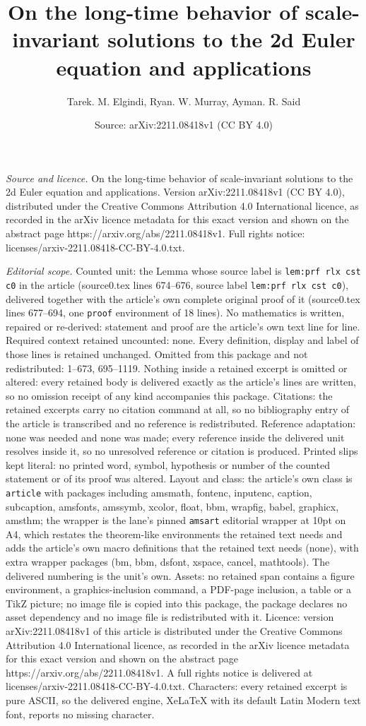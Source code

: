 \documentclass[10pt,a4paper]{amsart}
\title[On the long-time behavior of scale-invariant solutions to th]{On the long-time behavior of scale-invariant solutions to the 2d Euler equation and applications}
\author{Tarek. M. Elgindi, Ryan. W. Murray, Ayman. R. Said}
\date{Source: arXiv:2211.08418v1 (CC BY 4.0)}
\begin{document}
\maketitle

\noindent\emph{Source and licence.} On the long-time behavior of scale-invariant solutions to the 2d Euler equation and applications. Version arXiv:2211.08418v1 (CC BY 4.0), distributed under the Creative Commons Attribution 4.0 International licence, as recorded in the arXiv licence metadata for this exact version and shown on the abstract page https://arxiv.org/abs/2211.08418v1. Full rights notice: licenses/arxiv-2211.08418-CC-BY-4.0.txt.\par\smallskip

\noindent\textit{Editorial scope.} Counted unit: the Lemma whose source label is \texttt{lem:prf rlx cst c0} in the article (source0.tex lines 674--676, source label \texttt{lem:prf rlx cst c0}), delivered together with the article's own complete original proof of it (source0.tex lines 677--694, one \texttt{proof} environment of 18 lines). No mathematics is written, repaired or re-derived: statement and proof are the article's own text line for line. Required context retained uncounted: none. Every definition, display and label of those lines is retained unchanged. Omitted from this package and not redistributed: 1--673, 695--1119. Nothing inside a retained excerpt is omitted or altered: every retained body is delivered exactly as the article's lines are written, so no omission receipt of any kind accompanies this package. Citations: the retained excerpts carry no citation command at all, so no bibliography entry of the article is transcribed and no reference is redistributed. Reference adaptation: none was needed and none was made; every reference inside the delivered unit resolves inside it, so no unresolved reference or citation is produced. Printed slips kept literal: no printed word, symbol, hypothesis or number of the counted statement or of its proof was altered. Layout and class: the article's own class is \texttt{article} with packages including amsmath, fontenc, inputenc, caption, subcaption, amsfonts, amssymb, xcolor, float, bbm, wrapfig, babel, graphicx, amsthm; the wrapper is the lane's pinned \texttt{amsart} editorial wrapper at 10pt on A4, which restates the theorem-like environments the retained text needs and adds the article's own macro definitions that the retained text needs (none), with extra wrapper packages (bm, bbm, dsfont, xspace, cancel, mathtools). The delivered numbering is the unit's own. Assets: no retained span contains a figure environment, a graphics-inclusion command, a PDF-page inclusion, a table or a TikZ picture; no image file is copied into this package, the package declares no asset dependency and no image file is redistributed with it. Licence: version arXiv:2211.08418v1 of this article is distributed under the Creative Commons Attribution 4.0 International licence, as recorded in the arXiv licence metadata for this exact version and shown on the abstract page https://arxiv.org/abs/2211.08418v1. A full rights notice is delivered at licenses/arxiv-2211.08418-CC-BY-4.0.txt. Characters: every retained excerpt is pure ASCII, so the delivered engine, XeLaTeX with its default Latin Modern text font, reports no missing character.
\end{document}
